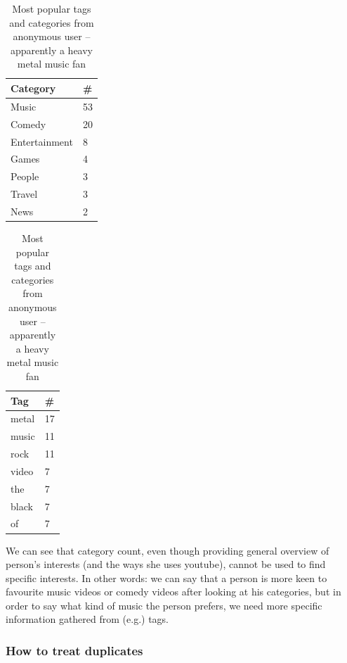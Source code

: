 \documentclass{article}
\begin{document}
\begin{table}
\begin{minipage}[b]{0.5\linewidth}\centering

\begin{tabular}{| l | l |}
Category & \# \\ \hline
Music & 53 \\
Comedy & 20 \\
Entertainment & 8 \\
Games & 4 \\
People & 3 \\
Travel & 3 \\
News & 2 \\
\end{tabular}

\end{minipage}
\hspace{0.5cm}
\begin{minipage}[b]{0.5\linewidth}
\centering

\begin{tabular}{| l | l |}
Tag & \# \\ \hline
metal & 17 \\
music & 11 \\
rock & 11 \\
video & 7 \\
the & 7 \\
black & 7 \\
of & 7 \\
\end{tabular}

\end{minipage}

\caption{Most popular tags and categories from anonymous user -- apparently a
heavy metal music fan}
\end{table}

We can see that category count, even though providing general overview of
person's interests (and the ways she uses youtube), cannot be used to find
specific interests. In other words: we can say that a person is more keen to
favourite music videos or comedy videos after looking at his categories, but in
order to say what kind of music the person prefers, we need more specific
information gathered from (e.g.) tags.

\subsubsection{How to treat duplicates}
\end{document}

